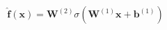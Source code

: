\documentclass[preview]{standalone}
\begin{document}
\begin{align*}
\hat{\mathbf{f}}(\mathbf{x}) = \mathbf{W}^{(2)} \sigma\left(\mathbf{W}^{(1)} \mathbf{x} + \mathbf{b}^{(1)}\right)
\end{align*}
\end{document}
